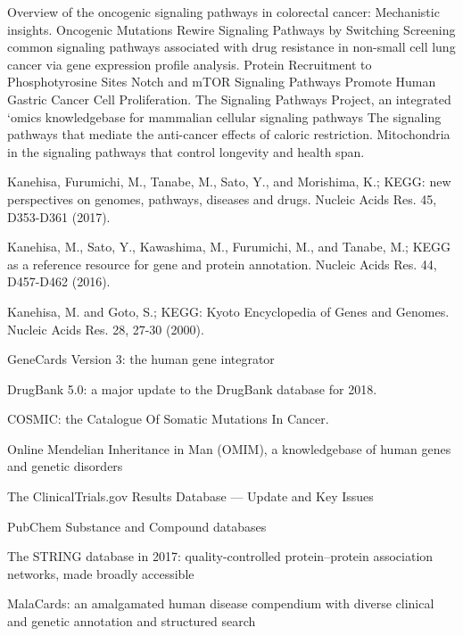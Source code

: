  
 Overview of the oncogenic signaling pathways in colorectal cancer: Mechanistic insights.
Oncogenic Mutations Rewire Signaling Pathways by Switching
 Screening common signaling pathways associated with drug resistance in non-small cell lung cancer via gene expression profile analysis. Protein Recruitment to Phosphotyrosine Sites
 Notch and mTOR Signaling Pathways Promote Human Gastric Cancer Cell Proliferation.
 The Signaling Pathways Project, an integrated ‘omics knowledgebase for mammalian cellular signaling pathways
 The signaling pathways that mediate the anti-cancer effects of caloric restriction.
 Mitochondria in the signaling pathways that control longevity and health span.


 Kanehisa, Furumichi, M., Tanabe, M., Sato, Y., and Morishima, K.; 
\newblock KEGG: new perspectives on genomes, pathways, diseases and drugs. 
\newblock Nucleic Acids Res. 45, D353-D361 (2017).

 Kanehisa, M., Sato, Y., Kawashima, M., Furumichi, M., and Tanabe, M.; 
\newblock KEGG as a reference resource for gene and protein annotation. 
\newblock Nucleic Acids Res. 44, D457-D462 (2016).

 Kanehisa, M. and Goto, S.; 
\newblock KEGG: Kyoto Encyclopedia of Genes and Genomes. 
\newblock Nucleic Acids Res. 28, 27-30 (2000).

GeneCards Version 3: the human gene integrator

 DrugBank 5.0: a major update to the DrugBank database for 2018.

 COSMIC: the Catalogue Of Somatic Mutations In Cancer.

 Online Mendelian Inheritance in Man (OMIM), a knowledgebase of human genes and genetic disorders

 The ClinicalTrials.gov Results Database — Update and Key Issues

 PubChem Substance and Compound databases

 The STRING database in 2017: quality-controlled protein–protein association networks, made broadly accessible

 MalaCards: an amalgamated human disease compendium with diverse clinical and genetic annotation and structured search
